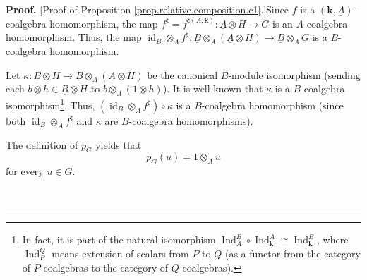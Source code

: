 \documentclass[numbers=enddot,12pt,final,onecolumn,notitlepage,abstracton]{scrartcl}%
\theoremstyle{definition}
\newenvironment{proof}[1][Proof]{\noindent\textbf{#1.} }{\ \rule{0.5em}{0.5em}}
\begin{document}
\begin{proof}
[Proof of Proposition \ref{prop.relative.composition.c1}.]Since $f$ is a
$\left(  \mathbf{k},\underline{A}\right)  $-coalgebra homomorphism, the map
$f^{\sharp}=f^{\sharp\left(  A,\mathbf{k}\right)  }:\underline{A}\otimes
H\rightarrow G$ is an $A$-coalgebra homomorphism. Thus, the map
$\operatorname*{id}\nolimits_{B}\otimes_{A}f^{\sharp}:\underline{B}\otimes
_{A}\left(  \underline{A}\otimes H\right)  \rightarrow\underline{B}\otimes
_{A}G$ is a $B$-coalgebra homomorphism.

Let $\kappa:\underline{B}\otimes H\rightarrow\underline{B}\otimes_{A}\left(
\underline{A}\otimes H\right)  $ be the canonical $B$-module isomorphism
(sending each $b\otimes h\in\underline{B}\otimes H$ to $b\otimes_{A}\left(
1\otimes h\right)  $). It is well-known that $\kappa$ is a $B$-coalgebra
isomorphism\footnote{In fact, it is part of the natural isomorphism
$\operatorname*{Ind}\nolimits_{A}^{B}\circ\operatorname*{Ind}%
\nolimits_{\mathbf{k}}^{A}\cong\operatorname*{Ind}\nolimits_{\mathbf{k}}^{B}$,
where $\operatorname*{Ind}\nolimits_{P}^{Q}$ means extension of scalars from
$P$ to $Q$ (as a functor from the category of $P$-coalgebras to the category
of $Q$-coalgebras).}. Thus, $\left(  \operatorname*{id}\nolimits_{B}%
\otimes_{A}f^{\sharp}\right)  \circ\kappa$ is a $B$-coalgebra homomorphism
(since both $\operatorname*{id}\nolimits_{B}\otimes_{A}f^{\sharp}$ and
$\kappa$ are $B$-coalgebra homomorphisms).

The definition of $p_{G}$ yields that
\begin{equation}
p_{G}\left(  u\right)  =1\otimes_{A}u
\label{pf.prop.relative.composition.c1.1}%
\end{equation}
for every $u\in G$.


\end{proof}
\end{document}
